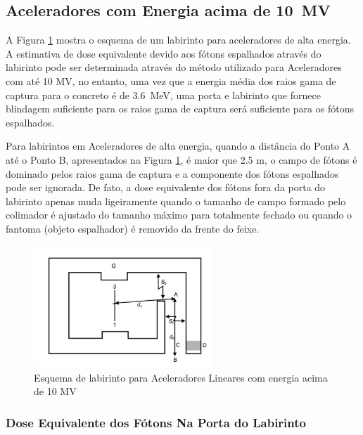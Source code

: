 \documentclass[11pt,a4paper]{article}
\begin{document}
        \subsection{Aceleradores com Energia acima de \qty{10}{MV}}
        

            A Figura \ref{fig:esquemaLabirintoNeutrons} mostra o esquema de um labirinto para aceleradores de alta energia. A estimativa de dose equivalente devido aos fótons espalhados através do labirinto pode ser determinada através do método utilizado para Aceleradores com até 10 MV, no entanto, uma vez que a energia média dos raios gama de captura para o concreto é de \qty{3.6}{MeV}, uma porta e labirinto que fornece blindagem suficiente para os raios gama de captura será suficiente para os fótons espalhados.

            Para labirintos em Aceleradores de alta energia, quando a distância do Ponto A até o Ponto B, apresentados na Figura \ref{fig:esquemaLabirintoNeutrons}, é maior que 2.5 m, o campo de fótons é dominado pelos raios gama de captura e a componente dos fótons espalhados pode ser ignorada. De fato, a dose equivalente dos fótons fora da porta do labirinto apenas muda ligeiramente quando o tamanho de campo formado pelo colimador é ajustado do tamanho máximo para totalmente fechado ou quando o fantoma (objeto espalhador) é removido da frente do feixe. 

             

            \begin{figure}[h]
                \centering
                \includegraphics[width=0.6\textwidth]{Imagens/esquemaLabirintoNeutrons.jpg}
                \caption{Esquema de labirinto para Aceleradores Lineares com energia acima de 10 MV}
                \label{fig:esquemaLabirintoNeutrons}
            \end{figure}

    \subsubsection{Dose Equivalente dos Fótons Na Porta do Labirinto}
\end{document}
